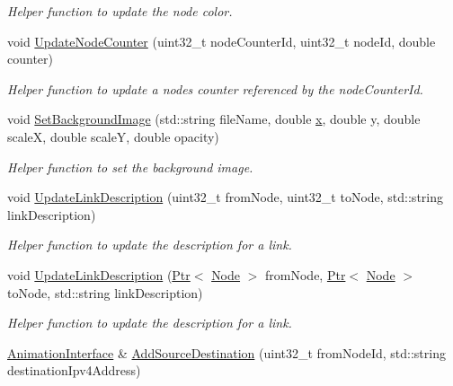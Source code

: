 \begin{DoxyCompactItemize}
\begin{DoxyCompactList}\small\item\em Helper function to update the node color. \end{DoxyCompactList}\item 
void \hyperlink{classns3_1_1AnimationInterface_a3a4739fd963384b6e3ded75124c03e15}{Update\+Node\+Counter} (uint32\+\_\+t node\+Counter\+Id, uint32\+\_\+t node\+Id, double counter)
\begin{DoxyCompactList}\small\item\em Helper function to update a node\textquotesingle{}s counter referenced by the node\+Counter\+Id. \end{DoxyCompactList}\item 
void \hyperlink{classns3_1_1AnimationInterface_abe3918b883455cb87fdc89ff7b69ed59}{Set\+Background\+Image} (std\+::string file\+Name, double \hyperlink{lte__link__budget__x2__handover__measures_8m_a9336ebf25087d91c818ee6e9ec29f8c1}{x}, double y, double scaleX, double scaleY, double opacity)
\begin{DoxyCompactList}\small\item\em Helper function to set the background image. \end{DoxyCompactList}\item 
void \hyperlink{classns3_1_1AnimationInterface_a6e85be8d6af4296c0ea3c914c06d5944}{Update\+Link\+Description} (uint32\+\_\+t from\+Node, uint32\+\_\+t to\+Node, std\+::string link\+Description)
\begin{DoxyCompactList}\small\item\em Helper function to update the description for a link. \end{DoxyCompactList}\item 
void \hyperlink{classns3_1_1AnimationInterface_afe10a4b435b250ff1738f05f806005a5}{Update\+Link\+Description} (\hyperlink{classns3_1_1Ptr}{Ptr}$<$ \hyperlink{classns3_1_1Node}{Node} $>$ from\+Node, \hyperlink{classns3_1_1Ptr}{Ptr}$<$ \hyperlink{classns3_1_1Node}{Node} $>$ to\+Node, std\+::string link\+Description)
\begin{DoxyCompactList}\small\item\em Helper function to update the description for a link. \end{DoxyCompactList}\item 
\hyperlink{classns3_1_1AnimationInterface}{Animation\+Interface} \& \hyperlink{classns3_1_1AnimationInterface_a78b6e368c75a903b6a78d2475374a990}{Add\+Source\+Destination} (uint32\+\_\+t from\+Node\+Id, std\+::string destination\+Ipv4\+Address)

\end{DoxyCompactItemize}
